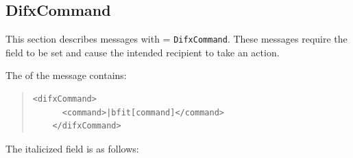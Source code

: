 
\subsection{DifxCommand}

This section describes messages with  = {\tt DifxCommand}.
These messages require the  field to be set and cause the intended recipient to take an action.

The  of the message contains:

\begin{quotation} 
\begin{Verbatim}[commandchars=\|\[\]] 
    <difxCommand>
      <command>|bfit[command]</command>
    </difxCommand>
\end{Verbatim}
\end{quotation}

\noindent The italicized field is as follows:

